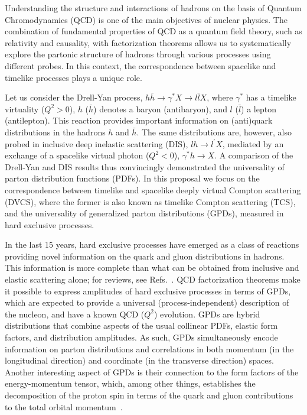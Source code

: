 Understanding the structure and interactions of hadrons on the basis of
Quantum Chromodynamics (QCD) is one of the main objectives of nuclear physics.
The combination of fundamental properties of QCD as a quantum field theory,
such as relativity and causality, with factorization theorems allows us to
systematically explore the partonic structure of hadrons through various
processes using different probes. In this context, the correspondence between
spacelike and timelike processes plays a unique role. 

Let us consider the Drell-Yan process, $h{\bar h} \to \gamma^{\ast}X
\to l{\bar l}X$, where $\gamma^{\ast}$ has a timelike virtuality ($Q^2 > 0$),
$h$ (${\bar h}$) denotes a baryon (antibaryon), and $l$ (${\bar l}$) a lepton
(antilepton). This reaction provides important information on (anti)quark
distributions in the hadrons $h$ and ${\bar h}$.
The same distributions are, however, also probed in inclusive deep inelastic
scattering (DIS), $l h \to l^{\prime} X$, mediated by an exchange of a
spacelike virtual photon ($Q^2 < 0$), $\gamma^{\ast}h \to X$.
A comparison of the Drell-Yan and DIS results thus convincingly
demonstrated the universality of parton distribution functions (PDFs).
In this proposal we focus on the correspondence between timelike and spacelike
deeply virtual Compton scattering (DVCS), where the former is also known as
timelike Compton scattering (TCS), and the universality of generalized parton
distributions (GPDs), measured in hard exclusive processes.

In the last 15 years, hard exclusive processes have emerged as a class of
reactions providing novel information on the quark and gluon distributions
in hadrons. This information is more complete than what can be obtained
from inclusive and elastic scattering alone; for reviews, see
Refs.~\cite{Goeke:2001tz,Diehl:2003ny,Belitsky:2005qn}.
QCD factorization theorems \cite{Collins:1996fb,Collins:1998be} make it
possible to express amplitudes of hard exclusive processes in terms of GPDs,
which are expected to provide a universal (process-independent) description
of the nucleon, and have a known QCD ($Q^2$) evolution. GPDs are hybrid
distributions that combine aspects of the usual collinear PDFs, elastic
form factors, and distribution amplitudes.
As such, GPDs simultaneously encode information on parton
distributions and correlations in both momentum (in the longitudinal
direction) and coordinate (in the transverse direction) spaces.
Another interesting aspect of GPDs is their connection to the form factors
of the energy-momentum tensor, which, among other things, establishes the
decomposition of the proton spin in terms of the quark and gluon
contributions to the total orbital momentum~\cite{Ji:1996ek}.

